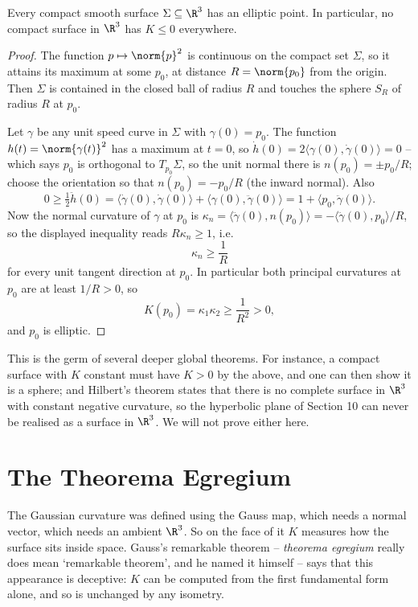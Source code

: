 \begin{theorem}
    Every compact smooth surface $\Sigma \subseteq \R^3$ has an elliptic point. In particular, no compact surface in $\R^3$ has $K \leq 0$ everywhere.
\end{theorem}
\begin{proof}
    The function $p \mapsto \norm{p}^2$ is continuous on the compact set $\Sigma$, so it attains its maximum at some $p_0$, at distance $R = \norm{p_0}$ from the origin. Then $\Sigma$ is contained in the closed ball of radius $R$ and touches the sphere $S_R$ of radius $R$ at $p_0$.

    Let $\gamma$ be any unit speed curve in $\Sigma$ with $\gamma(0) = p_0$. The function $h(t) = \norm{\gamma(t)}^2$ has a maximum at $t = 0$, so $\dot h(0) = 2\langle \gamma(0), \dot\gamma(0)\rangle = 0$ -- which says $p_0$ is orthogonal to $T_{p_0}\Sigma$, so the unit normal there is $n(p_0) = \pm p_0/R$; choose the orientation so that $n(p_0) = -p_0/R$ (the inward normal). Also
    $$
    0 \geq \tfrac12\ddot h(0) = \langle \dot\gamma(0), \dot\gamma(0)\rangle + \langle \gamma(0), \ddot\gamma(0)\rangle = 1 + \langle p_0, \ddot\gamma(0)\rangle.
    $$
    Now the normal curvature of $\gamma$ at $p_0$ is $\kappa_n = \langle \ddot\gamma(0), n(p_0)\rangle = -\langle \ddot\gamma(0), p_0\rangle/R$, so the displayed inequality reads $R\kappa_n \geq 1$, i.e.
    $$
    \kappa_n \geq \frac{1}{R}
    $$
    for every unit tangent direction at $p_0$. In particular both principal curvatures at $p_0$ are at least $1/R > 0$, so
    $$
    K(p_0) = \kappa_1\kappa_2 \geq \frac{1}{R^2} > 0,
    $$
    and $p_0$ is elliptic.
\end{proof}

\begin{remark}
    This is the germ of several deeper global theorems. For instance, a compact surface with $K$ constant must have $K > 0$ by the above, and one can then show it is a sphere; and Hilbert's theorem states that there is no complete surface in $\R^3$ with constant negative curvature, so the hyperbolic plane of Section 10 can never be realised as a surface in $\R^3$. We will not prove either here.
\end{remark}

\section{The Theorema Egregium}

The Gaussian curvature was defined using the Gauss map, which needs a normal vector, which needs an ambient $\R^3$. So on the face of it $K$ measures how the surface sits inside space. Gauss's remarkable theorem -- \emph{theorema egregium} really does mean `remarkable theorem', and he named it himself -- says that this appearance is deceptive: $K$ can be computed from the first fundamental form alone, and so is unchanged by any isometry.

